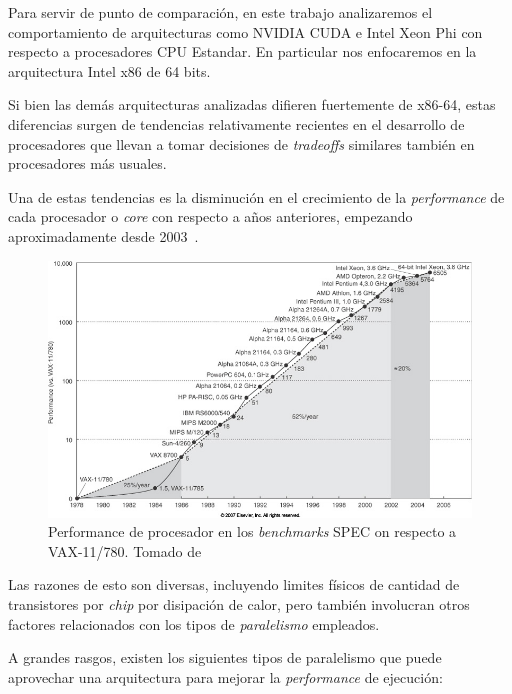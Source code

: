 Para servir de punto de comparaci\'on, en este trabajo analizaremos el 
comportamiento de arquitecturas como NVIDIA CUDA e Intel Xeon Phi con respecto a procesadores
CPU Estandar. En particular nos enfocaremos en la arquitectura Intel x86 de 64 bits.

Si bien las dem\'as arquitecturas analizadas difieren fuertemente de x86-64, estas diferencias
surgen de tendencias relativamente recientes en el desarrollo de procesadores que llevan a
tomar decisiones de \textit{tradeoffs} similares tambi\'en en procesadores m\'as usuales.

Una de estas tendencias es la disminuci\'on en el crecimiento de la \textit{performance} de
cada procesador o \textit{core} con respecto a a\~nos anteriores, empezando aproximadamente
desde 2003~\cite{HennessyPatterson}.

\begin{figure}[htbp]
    \centering
    \includegraphics[width=\textwidth]{images/processor-performance.jpg}
    \caption{Performance de procesador en los \textit{benchmarks} SPEC on respecto a VAX-11/780. Tomado de~\cite{HennessyPatterson}}
    \label{processor_performance}
\end{figure}

Las razones de esto son diversas, incluyendo limites f\'isicos de cantidad de transistores
por \textit{chip} por disipaci\'on de calor, pero tambi\'en involucran otros factores 
relacionados con los tipos de \textit{paralelismo} empleados.

A grandes rasgos, existen los siguientes tipos de paralelismo que puede aprovechar una
arquitectura para mejorar la \textit{performance} de ejecuci\'on:

